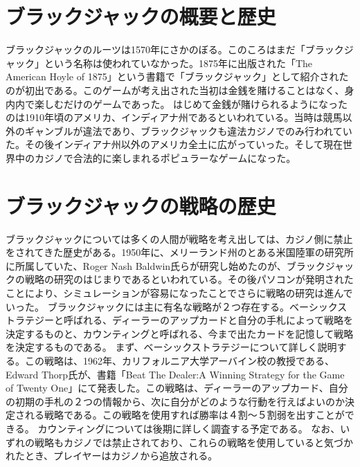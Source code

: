 \section{ブラックジャックの概要と歴史}
ブラックジャックのルーツは1570年にさかのぼる。このころはまだ「ブラックジャック」という名称は使われていなかった。1875年に出版された「The American Hoyle of 1875」という書籍で「ブラックジャック」として紹介されたのが初出である。このゲームが考え出された当初は金銭を賭けることはなく、身内内で楽しむだけのゲームであった。
はじめて金銭が賭けられるようになったのは1910年頃のアメリカ、インディアナ州であるといわれている。当時は競馬以外のギャンブルが違法であり、ブラックジャックも違法カジノでのみ行われていた。その後インディアナ州以外のアメリカ全土に広がっていった。そして現在世界中のカジノで合法的に楽しまれるポピュラーなゲームになった。

\section{ブラックジャックの戦略の歴史}
ブラックジャックについては多くの人間が戦略を考え出しては、カジノ側に禁止をされてきた歴史がある。1950年に、メリーランド州のとある米国陸軍の研究所に所属していた、Roger Nash Baldwin氏らが研究し始めたのが、ブラックジャックの戦略の研究のはじまりであるといわれている。その後パソコンが発明されたことにより、シミュレーションが容易になったことでさらに戦略の研究は進んでいった。
ブラックジャックには主に有名な戦略が２つ存在する。ベーシックストラテジーと呼ばれる、ディーラーのアップカードと自分の手札によって戦略を決定するものと、カウンティングと呼ばれる、今まで出たカードを記憶して戦略を決定するものである。
まず、ベーシックストラテジーについて詳しく説明する。この戦略は、1962年、カリフォルニア大学アーバイン校の教授である、Edward Thorp氏が、書籍「Beat The Dealer:A Winning Strategy for the Game of Twenty One」にて発表した。この戦略は、ディーラーのアップカード、自分の初期の手札の２つの情報から、次に自分がどのような行動を行えばよいのか決定される戦略である。この戦略を使用すれば勝率は４割～５割弱を出すことができる。
カウンティングについては後期に詳しく調査する予定である。
なお、いずれの戦略もカジノでは禁止されており、これらの戦略を使用していると気づかれたとき、プレイヤーはカジノから追放される。

